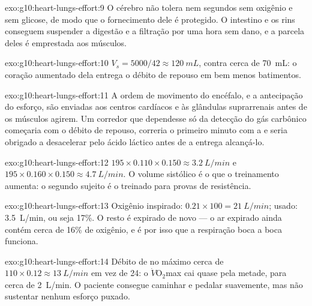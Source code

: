 \begin{solution}{exo:g10:heart-lungs-effort:9}
O cérebro não tolera nem segundos sem oxigênio e sem glicose, de modo
que o fornecimento dele é protegido. O intestino e os rins conseguem
suspender a digestão e a filtração por uma hora sem dano, e a parcela
deles é emprestada aos músculos.
\end{solution}

\begin{solution}{exo:g10:heart-lungs-effort:10}
$V_s = 5000/42 \approx \qty{120}{mL}$, contra cerca de \qty{70}{mL}: o
coração aumentado dela entrega o débito de repouso em bem menos
batimentos.
\end{solution}

\begin{solution}{exo:g10:heart-lungs-effort:11}
A ordem de movimento do encéfalo, e a antecipação do esforço, são
enviadas aos centros cardíacos e às glândulas suprarrenais antes de os
músculos agirem. Um corredor que dependesse só da detecção do gás
carbônico começaria com o débito de repouso, correria o primeiro minuto
com a  e seria obrigado a desacelerar pelo ácido láctico
antes de a entrega alcançá-lo.
\end{solution}

\begin{solution}{exo:g10:heart-lungs-effort:12}
$195 \times 0.110 \times 0.150 \approx \qty{3.2}{L/min}$ e
$195 \times 0.160 \times 0.150 \approx \qty{4.7}{L/min}$. O volume
sistólico é o que o treinamento aumenta: o segundo sujeito é o treinado
para provas de resistência.
\end{solution}

\begin{solution}{exo:g10:heart-lungs-effort:13}
Oxigênio inspirado: $0.21 \times 100 = \qty{21}{L/min}$; usado:
\qty{3.5}{L/min}, ou seja 17\%. O resto é expirado de novo --- o ar
expirado ainda contém cerca de 16\% de oxigênio, e é por isso que a
respiração boca a boca funciona.
\end{solution}

\begin{solution}{exo:g10:heart-lungs-effort:14}
Débito de no máximo cerca de $110 \times 0.12 \approx \qty{13}{L/min}$
em vez de 24: o $\dot V\!\mathrm{O_2}$max cai quase pela metade, para
cerca de \qty{2}{L/min}. O paciente consegue caminhar e pedalar
suavemente, mas não sustentar nenhum esforço puxado.
\end{solution}

